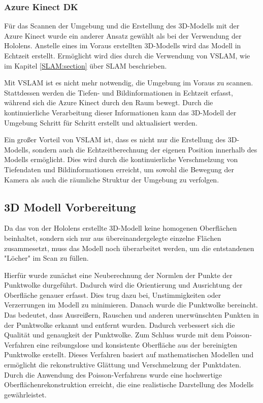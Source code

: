         \subsubsection{Azure Kinect \ac{DK}} \label{kinect:subsubsection}
        Für das Scannen der Umgebung und die Erstellung des 3D-Modells mit der Azure Kinect wurde ein anderer Ansatz gewählt als bei der Verwendung der Hololens. Anstelle eines im Voraus erstellten 3D-Modells wird das Modell in Echtzeit erstellt. Ermöglicht wird dies durch die Verwendung von \ac{VSLAM}, wie im Kapitel \ref{SLAM:section} über \ac{SLAM} beschrieben.

        Mit \ac{VSLAM} ist es nicht mehr notwendig, die Umgebung im Voraus zu scannen. Stattdessen werden die Tiefen- und Bildinformationen in Echtzeit erfasst, während sich die Azure Kinect durch den Raum bewegt. Durch die kontinuierliche Verarbeitung dieser Informationen kann das 3D-Modell der Umgebung Schritt für Schritt erstellt und aktualisiert werden.

        Ein großer Vorteil von \ac{VSLAM} ist, dass es nicht nur die Erstellung des 3D-Modells, sondern auch die Echtzeitberechnung der eigenen Position innerhalb des Modells ermöglicht. Dies wird durch die kontinuierliche Verschmelzung von Tiefendaten und Bildinformationen erreicht, um sowohl die Bewegung der Kamera als auch die räumliche Struktur der Umgebung zu verfolgen.

    \subsection{3D Modell Vorbereitung} \label{3d_modell_vorbereitung:subsection}
    Da das von der Hololens erstellte 3D-Modell keine homogenen Oberflächen beinhaltet, sondern sich nur aus übereinandergelegte einzelne Flächen zusammesetzt, muss das Modell noch überarbeitet werden, um die entstandenen "Löcher" im Scan zu füllen.
    
    Hierfür wurde zunächst eine Neuberechnung der Normlen der Punkte der Punktwolke durgeführt. Dadurch wird die Orientierung und Ausrichtung der Oberfläche genauer erfasst. Dies trug dazu bei, Unstimmigkeiten oder Verzerrungen im Modell zu minimieren. Danach wurde die Punktwolke bereincht. Das bedeutet, dass Ausreißern, Rauschen und anderen unerwünschten Punkten in der Punktwolke erkannt und entfernt wurden. Dadurch verbessert sich die Qualität und genaugkeit der Punktwolke. Zum Schluss wurde mit dem Poisson-Verfahren eine reibungslose und konsistente Oberfläche aus der bereinigten Punktwolke erstellt. Dieses Verfahren basiert auf mathematischen Modellen und ermöglicht die rekonstruktive Glättung und Verschmelzung der Punktdaten. Durch die Anwendung des Poisson-Verfahrens wurde eine hochwertige Oberflächenrekonstruktion erreicht, die eine realistische Darstellung des Modells gewährleistet.

